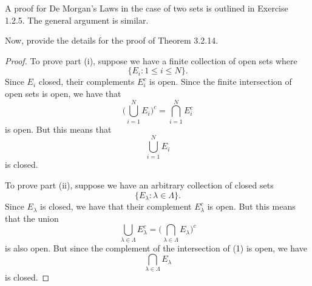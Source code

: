 A proof for De Morgan's Laws in the case of two sets is outlined in Exercise 1.2.5. The general argument is similar. 

Now, provide the details for the proof of Theorem 3.2.14. 
    \begin{proof}
    To prove part (i), suppose we have a finite collection of open sets where 
    \[ \{ E_{i} : 1 \leq  i \leq N \}.   \]
    Since \( E_i  \) closed, their complements \( E_i^c \) is open. Since the finite intersection of open sets is open, we have that 
    \[\Big(  \bigcup_{ i=1 }^{ N } E_{i} \Big)^c = \bigcap_{ i=1 }^{ N  } E_{i}^c  \]
    is open. But this means that 
    \[ \bigcup_{i=1}^{N} E_{i} \]
    is closed. 

    To prove part (ii), suppose we have an arbitrary collection of closed sets 
    \[ \{ E_\lambda : \lambda \in \Lambda \}.  \]
    Since \(E_{\lambda}\) is closed, we have that their complement \( E_{\lambda}^c \) is open. But this means that the union 
    \[ \bigcup_{\lambda \in \Lambda} E_{\lambda}^c = \Big( \bigcap_{ \lambda \in \Lambda } E_{\lambda}  \Big)^c \tag{1} \]
    is also open. But since the complement of the intersection of (1) is open, we have 
    \[ \bigcap_{ \lambda \in \Lambda } E_{\lambda}  \]
    is closed. 
    \end{proof}

